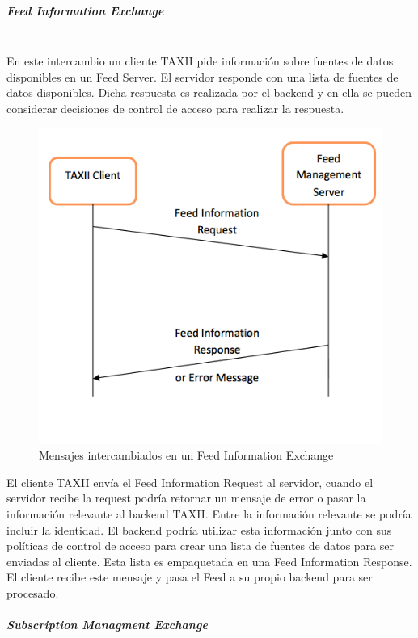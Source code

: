 \subparagraph{Feed Information Exchange}\ \\

En este intercambio un cliente TAXII pide información sobre fuentes de datos disponibles en 
un Feed Server. El servidor responde con una lista de fuentes de datos 
disponibles. Dicha respuesta es realizada por el backend y en ella se pueden considerar 
decisiones de control de acceso para realizar la respuesta.\\

\begin{figure}[ht!]
  \centering
    \includegraphics[width=150mm]{./images/FeedInformationExchange.png}
    \caption{Mensajes intercambiados en un Feed Information Exchange \protect\cite{b1}}
\end{figure}

El cliente TAXII envía el Feed Information Request al 
servidor, cuando el servidor recibe la request podría retornar un mensaje de 
error o pasar la información relevante al backend TAXII. Entre la información 
relevante se podría incluir la identidad. El backend podría utilizar esta 
información junto con sus políticas de control de acceso para crear una lista de 
fuentes de datos para ser enviadas al cliente. Esta lista es empaquetada en una 
Feed Information Response. El cliente recibe este mensaje y pasa el Feed a su 
propio backend para ser procesado.

\subparagraph{Subscription Managment Exchange}\ \\

